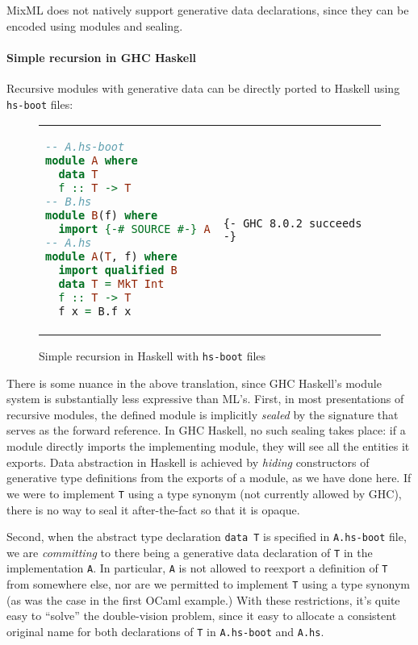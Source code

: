 \noindent
MixML does not natively support generative data declarations, since they can be
encoded using modules and sealing.

\paragraph{Simple recursion in GHC Haskell} Recursive modules
with generative data can be directly ported to Haskell using \verb|hs-boot| files:

\begin{figure}[H]
\begin{tabular}{p{} p{}}
\begin{lstlisting}[language=Haskell,escapechar=@]
-- A.hs-boot
module A where
  data T
  f :: T -> T
-- B.hs
module B(f) where
  import {-# SOURCE #-} A
-- A.hs
module A(T, f) where
  import qualified B
  data T = MkT Int
  f :: T -> T
  f x = B.f x
\end{lstlisting}
&
\begin{verbatim}
{- GHC 8.0.2 succeeds -}
\end{verbatim}
\end{tabular}
\caption{Simple recursion in Haskell with \texttt{hs-boot} files}
\label{fig:double-vision-simple-recursion-haskell-hs-boot}
\end{figure}

\noindent
There is some nuance in the above translation, since GHC Haskell's module
system is substantially less expressive than ML's.  First, in most
presentations of recursive modules, the defined module is implicitly
\emph{sealed} by the signature that serves as the forward reference.
In GHC Haskell, no such sealing takes place: if a module directly
imports the implementing module, they will see all the entities it
exports.  Data abstraction in Haskell is achieved by \emph{hiding}
constructors of generative type definitions from the exports of a module, as we
have done here. If we were to implement \verb|T| using a type synonym
(not currently allowed by GHC), there is no way to seal it after-the-fact
so that it is opaque.

Second, when the abstract type declaration \verb|data T| is specified in
\verb|A.hs-boot| file, we are \emph{committing} to there being a
generative data declaration of \verb|T| in the implementation \verb|A|.
In particular, \verb|A| is not allowed to reexport a definition of
\verb|T| from somewhere else, nor are we permitted to implement \verb|T|
using a type synonym (as was the case in the first OCaml example.)
With these restrictions, it's quite easy to ``solve'' the double-vision
problem, since it easy to allocate a consistent original name for both
declarations of \verb|T| in \verb|A.hs-boot| and \verb|A.hs|.


